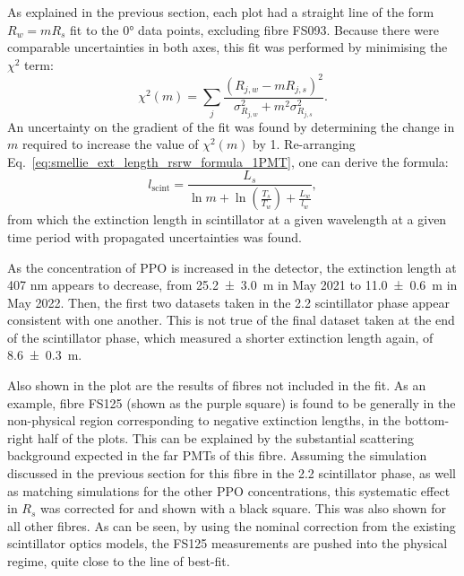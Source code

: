 As explained in the previous section, each plot had a straight line of the form $R_{w} = mR_{s}$ fit to the \ang{0} data points, excluding fibre FS093. Because there were comparable uncertainties in both axes, this fit was performed by minimising the $\chi^{2}$ term:
\begin{equation}
    \chi^{2}(m) = \sum_{j}\frac{\left(R_{j,w} - mR_{j,s}\right)^{2}}{\sigma^{2}_{R_{j,w}} + m^{2}\sigma^{2}_{R_{j,s}}}.
\end{equation}
An uncertainty on the gradient of the fit was found by determining the change in $m$ required to increase the value of $\chi^{2}(m)$ by 1. Re-arranging Eq.~\ref{eq:smellie_ext_length_rsrw_formula_1PMT}, one can derive the formula:
\begin{equation}
    l_{\mathrm{scint}} = 
    \frac{
        L_{s}
        }{
        \ln{m}
        + \ln\left(
            \frac{T_{s}}{T_{w}}
        \right)
        + \frac{L_{w}}{l_{w}}
    },
\end{equation}
from which the extinction length in scintillator at a given wavelength at a given time period with propagated uncertainties was found.

As the concentration of PPO is increased in the detector, the extinction length at 407 nm appears to decrease, from \SI{25.2 \pm 3.0}{\metre} in May 2021 to \SI{11.0 \pm 0.6}{\metre} in May 2022. Then, the first two datasets taken in the \SI{2.2}{\gpl} scintillator phase appear consistent with one another. This is not true of the final dataset taken at the end of the scintillator phase, which measured a shorter extinction length again, of \SI{8.6 \pm 0.3}{\metre}.

Also shown in the plot are the results of fibres not included in the fit. As an example, fibre FS125 (shown as the purple square) is found to be generally in the non-physical region corresponding to negative extinction lengths, in the bottom-right half of the plots. This can be explained by the substantial scattering background expected in the far PMTs of this fibre. Assuming the simulation discussed in the previous section for this fibre in the \SI{2.2}{\gpl} scintillator phase, as well as matching simulations for the other PPO concentrations, this systematic effect in $R_{s}$ was corrected for and shown with a black square. This was also shown for all other fibres. As can be seen, by using the nominal correction from the existing scintillator optics models, the FS125 measurements are pushed into the physical regime, quite close to the line of best-fit.

